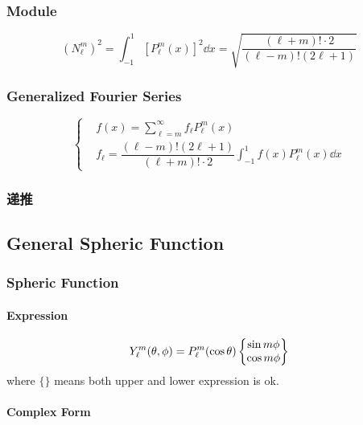 \documentclass[UTF8]{ctexart} %
\numberwithin{equation}{section}
\begin{document}
\subsubsection{Module}
\begin{equation}\label{key}
(N_\ell^m)^2 = \int_{-1}^1[P_\ell^m(x)]^2\dd x = \sqrt{\dfrac{(\ell + m)!\cdot 2}{(\ell - m)!(2\ell + 1)}}
\end{equation}

\subsubsection{Generalized Fourier Series}
\begin{equation}\label{key}
\left\{
\begin{aligned}
& f(x) = \sum_{\ell=m}^\infty f_\ell P_\ell^m(x)\\
& f_\ell = \dfrac{(\ell - m)!(2\ell + 1)}{(\ell + m)!\cdot 2}\int_{-1}^1 f(x) P_\ell^m(x)\dd x
\end{aligned}\right.
\end{equation}

\subsubsection{递推}


\subsection{General Spheric Function}
\subsubsection{Spheric Function}
\paragraph{Expression}
\begin{equation}\label{key}
Y_\ell^m(\theta,\phi) = P_\ell^m(\cos\theta)\left\{\mqty{\sin m\phi\\ \cos m\phi}\right\}
\end{equation}
where $\{ \}$ means both upper and lower expression is ok.

\paragraph{Complex Form}
\end{document}
